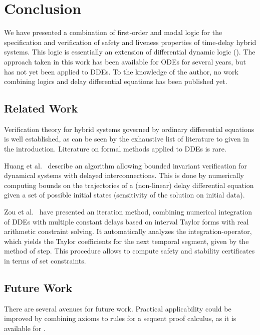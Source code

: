 \chapter{Conclusion}
    \label{ch:conclusion}

    We have presented a combination of first-order and modal logic for the specification and verification of safety and liveness properties of time-delay hybrid systems.
    This logic is essentially an extension of differential dynamic logic (\dL).
    The approach taken in this work has been available for ODEs for several years, but has not yet been applied to DDEs. 
    To the knowledge of the author, no work combining logics and delay differential equations has been published yet.

    \section{Related Work}
        Verification theory for hybrid systems governed by ordinary differential equations is well established, as can be seen by the exhaustive list of literature to \dL given in the introduction.
        Literature on formal methods applied to DDEs is rare.
        
        Huang et al.~\citeauthor{Huang16BoundedVerificationNNDS} describe an algorithm allowing bounded invariant verification for dynamical systems with delayed interconnections.
        This is done by numerically computing bounds on the trajectories of a (non-linear) delay differential equation given a set of possible initial states (sensitivity of the solution on initial data).
        
        Zou et al.~\cite{Zou15AutomaticVerifDDEs} have presented an iteration method, combining numerical integration of DDEs with multiple constant delays based on interval Taylor forms
        with real arithmetic constraint solving.
        It automatically analyzes the integration-operator, which yields the Taylor coefficients for the next temporal segment, given by the method of step.
        This procedure allows to compute safety and stability certificates in terms of set constraints.

    \section{Future Work}
        There are several avenues for future work. Practical applicability could be improved by combining axioms to rules for a sequent proof calculus, as it is available for \dL.

